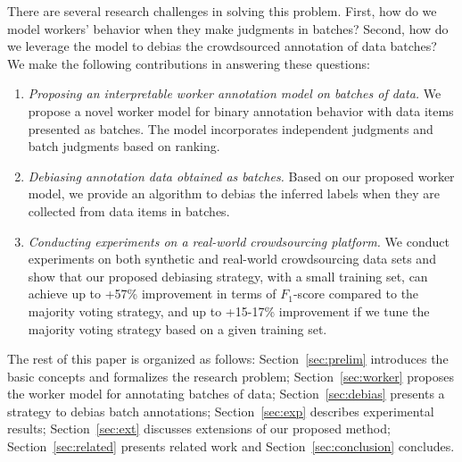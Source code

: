 There are several research challenges in solving this problem.
First, how do we model workers' behavior when they make judgments in batches?
Second, how do we leverage the model to debias the crowdsourced annotation of data batches?
We make the following contributions in answering these questions:
\begin{enumerate}
  \item \emph{Proposing an interpretable worker annotation model on batches of data.}
        We propose a novel worker model for binary annotation behavior with data items presented as batches.
        The model incorporates independent judgments and batch judgments based on ranking.
  \item \emph{Debiasing annotation data obtained as batches.}
        Based on our proposed worker model, we provide an algorithm to debias the inferred labels
        when they are collected from data items in batches.
  \item \emph{Conducting experiments on a real-world crowdsourcing platform.}
        We conduct experiments on both synthetic and real-world crowdsourcing data sets
        and show that our proposed debiasing strategy, with a small training set, 
        can achieve up to +57\% improvement in terms of $F_1$-score 
        compared to the majority voting strategy, 
        and up to +15-17\% improvement if we tune the majority voting strategy based on a given training set.  
\end{enumerate}

The rest of this paper is organized as follows:
Section~\ref{sec:prelim} introduces the basic concepts and formalizes the research problem;
Section~\ref{sec:worker} proposes the worker model for annotating batches of data;
Section~\ref{sec:debias} presents a strategy to debias batch annotations;
Section~\ref{sec:exp} describes experimental results;
Section~\ref{sec:ext} discusses extensions of our proposed method;
Section~\ref{sec:related} presents related work and Section~\ref{sec:conclusion} concludes.






